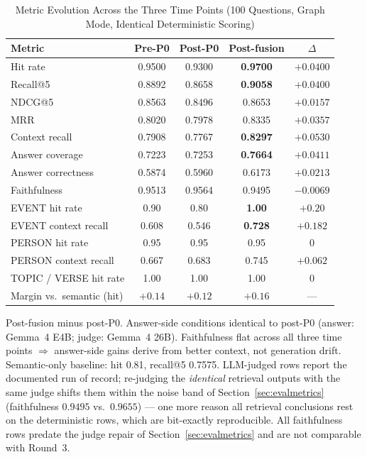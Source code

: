 \begin{table}[!t]
\caption{Metric Evolution Across the Three Time Points (100 Questions,
Graph Mode, Identical Deterministic Scoring)}
\label{tab:evolution}
\centering
\begin{threeparttable}
\footnotesize
\begin{tabular}{@{}lcccc@{}}
\toprule
Metric & Pre-P0 & Post-P0 & Post-fusion & $\Delta$\tnote{a} \\
\midrule
Hit rate & 0.9500 & 0.9300 & \textbf{0.9700} & $+0.0400$ \\
Recall@5 & 0.8892 & 0.8658 & \textbf{0.9058} & $+0.0400$ \\
NDCG@5   & 0.8563 & 0.8496 & 0.8653 & $+0.0157$ \\
MRR      & 0.8020 & 0.7978 & 0.8335 & $+0.0357$ \\
Context recall & 0.7908 & 0.7767 & \textbf{0.8297} & $+0.0530$ \\
Answer coverage & 0.7223 & 0.7253 & \textbf{0.7664} & $+0.0411$ \\
Answer correctness & 0.5874 & 0.5960 & 0.6173 & $+0.0213$ \\
Faithfulness & 0.9513 & 0.9564 & 0.9495 & $-0.0069$ \\
\midrule
EVENT hit rate & 0.90 & 0.80 & \textbf{1.00} & $+0.20$ \\
EVENT context recall & 0.608 & 0.546 & \textbf{0.728} & $+0.182$ \\
PERSON hit rate & 0.95 & 0.95 & 0.95 & 0 \\
PERSON context recall & 0.667 & 0.683 & 0.745 & $+0.062$ \\
TOPIC / VERSE hit rate & 1.00 & 1.00 & 1.00 & 0 \\
Margin vs.\ semantic (hit) & $+0.14$ & $+0.12$ & $\mathbf{+0.16}$ &
--- \\
\bottomrule
\end{tabular}
\begin{tablenotes}\footnotesize
\item[a] Post-fusion minus post-P0. Answer-side conditions identical to
post-P0 (answer: Gemma~4 E4B; judge: Gemma~4 26B). Faithfulness flat
across all three time points $\Rightarrow$ answer-side gains derive
from better context, not generation drift. Semantic-only baseline: hit
0.81, recall@5 0.7575. LLM-judged rows report the documented run of
record; re-judging the \emph{identical} retrieval outputs with the same
judge shifts them within the noise band of
Section~\ref{sec:evalmetrics} (\eg faithfulness $0.9495$ vs.\
$0.9655$) --- one more reason all retrieval conclusions rest on the
deterministic rows, which are bit-exactly reproducible. All faithfulness
rows predate the judge repair of Section~\ref{sec:evalmetrics} and are
not comparable with Round~3.
\end{tablenotes}
\end{threeparttable}
\end{table}


